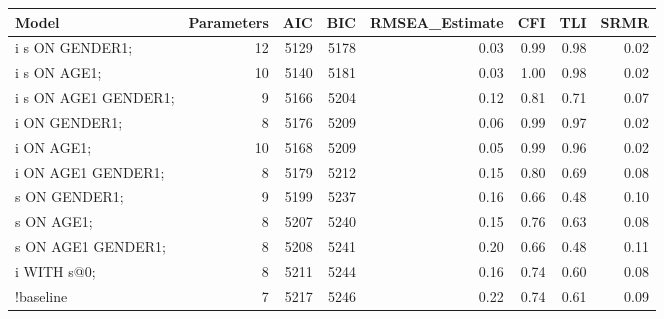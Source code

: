 \documentclass[
]{book}
\newenvironment{Shaded}{\begin{snugshade}}{\end{snugshade}}
\newcommand{\AttributeTok}[1]{\textcolor[rgb]{0.77,0.63,0.00}{#1}}
\newcommand{\CommentTok}[1]{\textcolor[rgb]{0.56,0.35,0.01}{\textit{#1}}}
\newcommand{\ConstantTok}[1]{\textcolor[rgb]{0.00,0.00,0.00}{#1}}
\newcommand{\FunctionTok}[1]{\textcolor[rgb]{0.00,0.00,0.00}{#1}}
\newcommand{\NormalTok}[1]{#1}
\newcommand{\OtherTok}[1]{\textcolor[rgb]{0.56,0.35,0.01}{#1}}
\newcommand{\SpecialCharTok}[1]{\textcolor[rgb]{0.00,0.00,0.00}{#1}}
\newcommand{\StringTok}[1]{\textcolor[rgb]{0.31,0.60,0.02}{#1}}
\begin{document}
\begin{Shaded}
\end{Shaded}

\begin{tabular}[t]{l|r|r|r|r|r|r|r}
\hline
Model & Parameters & AIC & BIC & RMSEA\_Estimate & CFI & TLI & SRMR\\
\hline
i s ON GENDER1; & 12 & 5129 & 5178 & 0.03 & 0.99 & 0.98 & 0.02\\
\hline
i s ON AGE1; & 10 & 5140 & 5181 & 0.03 & 1.00 & 0.98 & 0.02\\
\hline
i s ON AGE1 GENDER1; & 9 & 5166 & 5204 & 0.12 & 0.81 & 0.71 & 0.07\\
\hline
i ON GENDER1; & 8 & 5176 & 5209 & 0.06 & 0.99 & 0.97 & 0.02\\
\hline
i ON AGE1; & 10 & 5168 & 5209 & 0.05 & 0.99 & 0.96 & 0.02\\
\hline
i ON AGE1 GENDER1; & 8 & 5179 & 5212 & 0.15 & 0.80 & 0.69 & 0.08\\
\hline
s ON GENDER1; & 9 & 5199 & 5237 & 0.16 & 0.66 & 0.48 & 0.10\\
\hline
s ON AGE1; & 8 & 5207 & 5240 & 0.15 & 0.76 & 0.63 & 0.08\\
\hline
s ON AGE1 GENDER1; & 8 & 5208 & 5241 & 0.20 & 0.66 & 0.48 & 0.11\\
\hline
i WITH s@0; & 8 & 5211 & 5244 & 0.16 & 0.74 & 0.60 & 0.08\\
\hline
!baseline & 7 & 5217 & 5246 & 0.22 & 0.74 & 0.61 & 0.09\\
\hline
\end{tabular}
\end{document}
